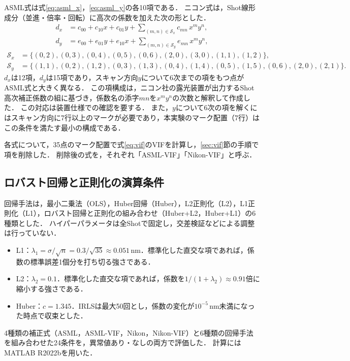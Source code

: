 \documentclass[11pt,a4paper]{ltjsarticle}
\begin{document}
ASML式は式\eqref{eq:asml_x}，\eqref{eq:asml_y}の各10項である．
ニコン式は，Shot線形成分（並進・倍率・回転）に高次の係数を加えた次の形とした．
\begin{align}
  d_x &= c_{00}+c_{10}x+c_{01}y+\sum_{(m,n)\in\mathcal S_x}c_{mn}\,x^my^n, \label{eq:nikon_x}\\
  d_y &= e_{00}+e_{01}y+e_{10}x+\sum_{(m,n)\in\mathcal S_y}e_{mn}\,x^my^n, \label{eq:nikon_y}
\end{align}
\begin{align*}
  \mathcal S_x&=\{(0,2),(0,3),(0,4),(0,5),(0,6),(2,0),(3,0),(1,1),(1,2)\},\\
  \mathcal S_y&=\{(1,1),(0,2),(1,2),(0,3),(1,3),(0,4),(1,4),(0,5),(1,5),(0,6),(2,0),(2,1)\}.
\end{align*}
$d_x$は12項，$d_y$は15項であり，スキャン方向$y$について6次までの項をもつ点がASML式と大きく異なる．
この項構成は，ニコン社の露光装置が出力するShot高次補正係数の組に基づき，係数名の添字$mn$を$x^my^n$の次数と解釈して作成した．
この対応は装置仕様での確認を要する．
また，$y$について6次の項を解くにはスキャン方向に7行以上のマークが必要であり，本実験のマーク配置（7行）はこの条件を満たす最小の構成である．

各式について，35点のマーク配置で式\eqref{eq:vif}のVIFを計算し，\ref{sec:vif}節の手順で項を削除した．
削除後の式を，それぞれ「ASML-VIF」「Nikon-VIF」と呼ぶ．

\subsection{ロバスト回帰と正則化の演算条件}

回帰手法は，最小二乗法（OLS），Huber回帰（Huber），L2正則化（L2），L1正則化（L1），ロバスト回帰と正則化の組み合わせ（Huber+L2，Huber+L1）の6種類とした．
ハイパーパラメータは全Shotで固定し，交差検証などによる調整は行っていない．
\begin{itemize}
  \item L1：$\lambda_1=\sigma/\sqrt{n}=0.3/\sqrt{35}\approx0.051$\,nm．標準化した直交な項であれば，係数の標準誤差1個分を打ち切る強さである．
  \item L2：$\lambda_2=0.1$．標準化した直交な項であれば，係数を$1/(1+\lambda_2)\approx0.91$倍に縮小する強さである．
  \item Huber：$c=1.345$．IRLSは最大50回とし，係数の変化が$10^{-5}$\,nm未満になった時点で収束とした．
\end{itemize}
4種類の補正式（ASML，ASML-VIF，Nikon，Nikon-VIF）と6種類の回帰手法を組み合わせた24条件を，異常値あり・なしの両方で評価した．
計算にはMATLAB R2022bを用いた．
\end{document}
